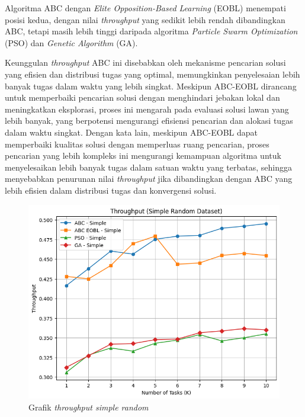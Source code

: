 Algoritma ABC dengan \textit{Elite Opposition-Based Learning} (EOBL) menempati posisi kedua, dengan nilai \textit{throughput} yang sedikit lebih rendah dibandingkan ABC, tetapi masih lebih tinggi daripada algoritma \textit{Particle Swarm Optimization} (PSO) dan \textit{Genetic Algorithm} (GA).

Keunggulan \textit{throughput} ABC ini disebabkan oleh mekanisme pencarian solusi yang efisien dan distribusi tugas yang optimal, memungkinkan penyelesaian lebih banyak tugas dalam waktu yang lebih singkat. Meskipun ABC-EOBL dirancang untuk memperbaiki pencarian solusi dengan menghindari jebakan lokal dan meningkatkan eksplorasi, proses ini mengarah pada evaluasi solusi lawan yang lebih banyak, yang berpotensi mengurangi efisiensi pencarian dan alokasi tugas dalam waktu singkat. Dengan kata lain, meskipun ABC-EOBL dapat memperbaiki kualitas solusi dengan memperluas ruang pencarian, proses pencarian yang lebih kompleks ini mengurangi kemampuan algoritma untuk menyelesaikan lebih banyak tugas dalam satuan waktu yang terbatas, sehingga menyebabkan penurunan nilai \textit{throughput} jika dibandingkan dengan ABC yang lebih efisien dalam distribusi tugas dan konvergensi solusi.

\begin{figure} [H]
    \centering
    \includegraphics[width=0.75\linewidth]{gambar/Grafik Throughput Simple Random.png}
    \caption{Grafik \textit{throughput simple random}}
\end{figure}

\newpage

